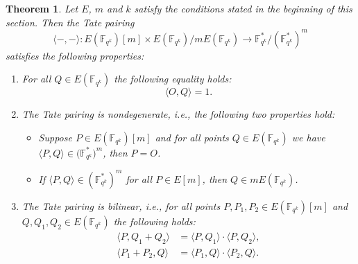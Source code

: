 \documentclass{article}
\numberwithin{equation}{section}
\newtheorem{theorem}{Theorem}[subsection]
\theoremstyle{definition}
\newcommand{\FF}[1]{{\mathbb F}_{#1}} %
\begin{document}
\begin{theorem}
Let $E$, $m$ and $k$ satisfy the conditions stated in the beginning of this section. Then the Tate pairing $$\langle -,-\rangle: E(\FF{q^k})[m] \times E(\FF{q^k})/mE(\FF{q^k}) \rightarrow \FF{q^k}^*/(\FF{q^k}^*)^m$$ satisfies the following properties:
\begin{enumerate}
\item For all $Q \in E(\FF{q^k})$ the following equality holds:$$ \langle O,Q \rangle = 1.$$
\item The Tate pairing is nondegenerate, i.e., the following two properties hold:
\begin{itemize}
\item Suppose $P\in E(\FF{q^k})[m]$ and for all points $Q\in E(\FF{q^k})$ we have $\langle P,Q\rangle \in \big(\FF{q^k}^*\big)^m$, then $P=O$. 
\item If $\langle P,Q\rangle \in (\FF{q^k}^*)^m$ for all $ P \in E[m] $, then $Q \in mE(\FF{q^k})$.
\end{itemize}
\item The Tate pairing is bilinear, i.e., for all points $P,P_1,P_2 \in E(\FF{q^k})[m]$ and $Q,Q_1,Q_2 \in E(\FF{q^k})$ the following holds: \begin{align*}\langle P,Q_1+Q_2 \rangle &= \langle P,Q_1 \rangle \cdot \langle P,Q_2 \rangle, \\ \langle P_1+P_2,Q \rangle &= \langle P_1,Q \rangle \cdot \langle P_2,Q \rangle. \end{align*}
\end{enumerate}
\end{theorem} 
\end{document}
